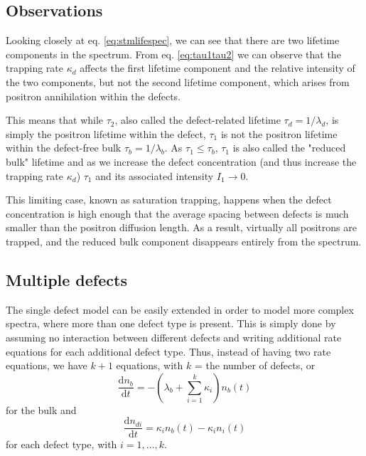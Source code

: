 \subsection{Observations}

Looking closely at eq. \ref{eq:stmlifespec}, we can see that there are two lifetime components in the spectrum. From eq. \ref{eq:tau1tau2} we can observe that the trapping rate $\kappa_d$ affects the first lifetime component and the relative intensity of the two components, but not the second lifetime component, which arises from positron annihilation within the defects. 

This means that while $\tau_2$, also called the defect-related lifetime $\tau_d = 1/\lambda_d$, is simply the positron lifetime within the defect, $\tau_1$ is not the positron lifetime within the defect-free bulk $\tau_b = 1/\lambda_b$. As $\tau_1 \leq \tau_b$, $\tau_1$ is also called the "reduced bulk" lifetime and as we increase the defect concentration (and thus increase the trapping rate $\kappa_d$) $\tau_{1}$ and its associated intensity $I_{1} \to 0$.

This limiting case, known as saturation trapping, happens when the defect concentration is high enough that the average spacing between defects is much smaller than the positron diffusion length. As a result, virtually all positrons are trapped, and the reduced bulk component disappears entirely from the spectrum.

\subsection{Multiple defects}

The single defect model can be easily extended in order to model more complex spectra, where more than one defect type is present. This is simply done by assuming no interaction between different defects and writing additional rate equations for each additional defect type. Thus, instead of having two rate equations, we have $k+1$ equations, with $k$ = the number of defects, or
\begin{equation}
    \dfrac{\mathrm{d}n_b}{\mathrm{d}t} = -\left(\lambda_b + \sum_{i=1}^{k} \kappa_i\right)n_b(t)
\end{equation}
for the bulk and
\begin{equation}
    \dfrac{\mathrm{d}n_{di}}{\mathrm{d}t} = \kappa_i n_b(t) - \kappa_i n_i(t)
\end{equation}
for each defect type, with $i = 1,\dots,k$.

